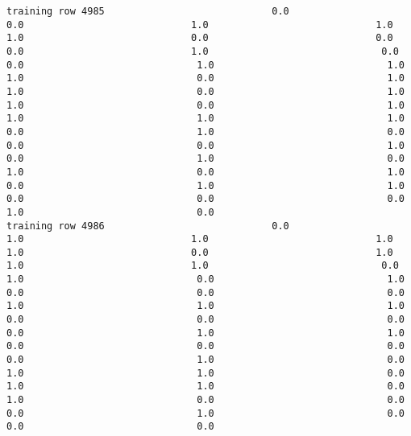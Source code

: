 \documentclass[11pt]{article}
\begin{document}
\begin{verbatim}
training row 4985                             0.0                             0.0                             1.0                             1.0                             1.0                             0.0                             0.0                             0.0                             1.0                              0.0                              0.0                              1.0                              1.0                              1.0                              0.0                              1.0                              1.0                              0.0                              1.0                              1.0                              0.0                              1.0                              1.0                              1.0                              1.0                              0.0                              1.0                              0.0                              0.0                              0.0                              1.0                              0.0                              1.0                              0.0                              1.0                              0.0                              1.0                              0.0                              1.0                              1.0                              0.0                              0.0                              0.0                              1.0                              0.0
training row 4986                             0.0                             1.0                             1.0                             1.0                             1.0                             0.0                             1.0                             1.0                             1.0                              0.0                              1.0                              0.0                              1.0                              0.0                              0.0                              0.0                              1.0                              1.0                              1.0                              0.0                              0.0                              0.0                              0.0                              1.0                              1.0                              0.0                              0.0                              0.0                              0.0                              1.0                              0.0                              1.0                              1.0                              0.0                              1.0                              1.0                              0.0                              1.0                              0.0                              0.0                              0.0                              1.0                              0.0                              0.0                              0.0

\end{verbatim}
\end{document}
